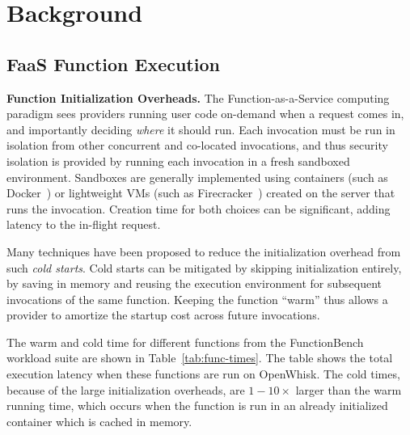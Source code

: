 
\section{Background}

\subsection{FaaS Function Execution} %

\noindent \textbf{Function Initialization Overheads.}
The Function-as-a-Service computing paradigm sees providers running user code on-demand when a request comes in, and importantly deciding \emph{where} it should run. 
Each invocation must be run in isolation from other concurrent and co-located invocations, and thus security isolation is provided by running each invocation in a fresh sandboxed environment. 
Sandboxes are generally implemented using containers (such as Docker~\cite{docker-main}) or lightweight VMs (such as Firecracker~\cite{firecracker-nsdi20}) created on the server that runs the invocation.
Creation time for both choices can be significant, adding latency to the in-flight request. 

Many techniques have been proposed to reduce the initialization overhead from such \emph{cold starts}.
Cold starts  can be mitigated by skipping initialization entirely, by saving in memory and reusing the execution environment for subsequent invocations of the same function. 
Keeping the function ``warm'' thus allows a provider to amortize the startup cost across future invocations. 

The warm and cold time for different functions from the FunctionBench~\cite{kim_functionbench_2019} workload suite are shown in Table~\ref{tab:func-times}.
The table shows the total execution latency when these functions are run on OpenWhisk.
The cold times, because of the large initialization overheads, are $1-10\times$ larger than the warm running time, which occurs when the function is run in an already initialized container which is cached in memory. 

